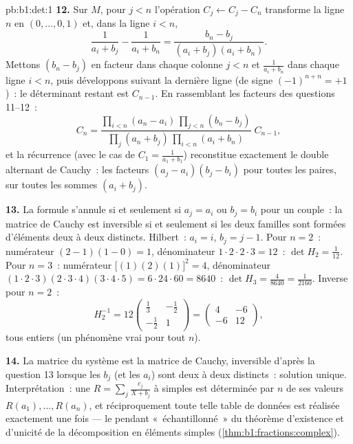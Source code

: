 \begin{solution}{pb:b1:det:1}
\textbf{12.} Sur $M$, pour $j < n$ l'opération $C_j \leftarrow
C_j - C_n$ transforme la ligne $n$ en $(0, \dots, 0, 1)$ et, dans la
ligne $i < n$,
\[
\frac{1}{a_i + b_j} - \frac{1}{a_i + b_n}
= \frac{b_n - b_j}{(a_i + b_j)(a_i + b_n)} .
\]
Mettons $(b_n - b_j)$ en facteur dans chaque colonne $j < n$ et
$\frac1{a_i + b_n}$ dans chaque ligne $i < n$, puis développons
suivant la dernière ligne (de signe $(-1)^{n+n} = +1$)~: le
déterminant restant est $C_{n-1}$. En rassemblant les facteurs des
questions 11--12~:
\[
C_n = \frac{\prod_{i<n}(a_n - a_i)\,\prod_{j<n}(b_n - b_j)}
{\prod_{j}(a_n + b_j)\,\prod_{i<n}(a_i + b_n)}\;C_{n-1},
\]
et la récurrence (avec le cas de  $C_1 = \frac1{a_1+b_1}$)
reconstitue exactement le double alternant de Cauchy~: les facteurs
$(a_j - a_i)(b_j - b_i)$ pour toutes les paires, sur toutes les sommes
$(a_i + b_j)$.

\textbf{13.} La formule s'annule si et seulement si $a_j = a_i$ ou
$b_j = b_i$ pour un couple~: la matrice de Cauchy est inversible si et
seulement si les deux familles sont formées d'éléments deux à deux
distincts. Hilbert~: $a_i = i$, $b_j = j - 1$. Pour $n =
2$~: numérateur $(2-1)(1-0) = 1$, dénominateur
$1\cdot2\cdot2\cdot3 = 12$~: $\det H_2 = \frac1{12}$. Pour $n = 3$~:
numérateur $\bigl[(1)(2)(1)\bigr]^2 = 4$, dénominateur
$(1\cdot2\cdot3)(2\cdot3\cdot4)(3\cdot4\cdot5) = 6\cdot24\cdot60 =
8640$~: $\det H_3 = \frac{4}{8640} = \frac1{2160}$. Inverse pour
$n = 2$~:
\[
H_2^{-1} = 12\begin{pmatrix} \frac13 & -\frac12\\[2pt]
-\frac12 & 1\end{pmatrix}
= \begin{pmatrix} 4 & -6\\ -6 & 12 \end{pmatrix},
\]
tous entiers (un phénomène vrai pour tout $n$).

\textbf{14.} La matrice du système est la matrice de Cauchy,
inversible d'après la question 13 lorsque les $b_j$ (et les $a_i$) sont
deux à deux distincts~: solution unique. Interprétation~: une  $R = \sum_j \frac{c_j}{X + b_j}$ à  simples est
déterminée par $n$ de ses valeurs $R(a_1), \dots, R(a_n)$, et
réciproquement toute telle table de données est réalisée exactement une
fois --- le pendant «~échantillonné~» du théorème d'existence et
d'unicité de la décomposition en éléments simples
(\cref{thm:b1:fractions:complex}).


\end{solution}
